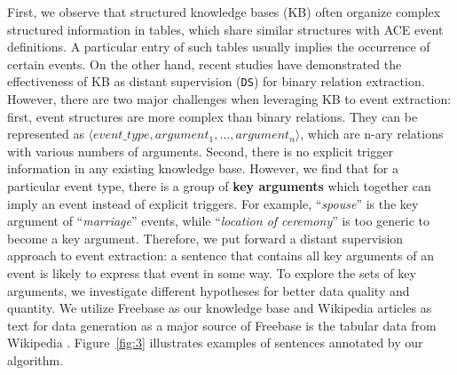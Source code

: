 First, we observe that structured knowledge bases (KB) often organize
complex structured information in tables, which share similar structures with ACE event definitions. A particular entry of such tables usually implies the occurrence of certain events.
On the other hand, recent studies \cite{mintz2009distant,zeng2015distant} have demonstrated the effectiveness of KB as distant supervision (\texttt{DS}) for binary relation extraction.
However, there are two major challenges when leveraging KB to event extraction: first, event structures are more complex than binary relations. They can be represented as $\langle event\_type, argument_1, \ldots, argument_n\rangle$, which are n-ary relations with various numbers of arguments. Second, there is no explicit trigger information in any existing knowledge base.
However, we find that for a particular event type, there is a group of \textbf{key arguments} which together can imply an event instead of explicit triggers. For example, ``\emph{spouse}'' is the key argument of ``\emph{marriage}'' events, while ``\emph{location of ceremony}'' is too generic to become a key argument. Therefore, we put forward a distant supervision approach to event extraction: a sentence that contains all key arguments of an event is likely to express that event in some way. To explore the sets of key arguments, we investigate different hypotheses for better data quality and quantity.
We utilize Freebase as our knowledge base and Wikipedia articles as text for data generation as a major source of Freebase is the tabular data from Wikipedia \cite{mintz2009distant}.
Figure~\ref{fig:3} illustrates examples of sentences annotated by our algorithm.

